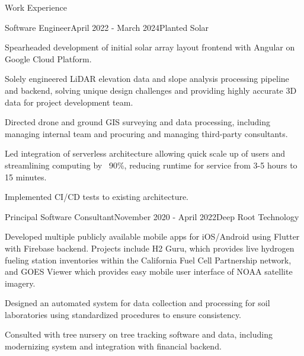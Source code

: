 \documentclass{resume} %
\begin{document}

\begin{rSection}{Work Experience}


\begin{rSubsection}{Software Engineer}{April 2022 - March 2024}{Planted Solar}{}
\item Spearheaded development of initial solar array layout frontend with Angular on Google Cloud Platform.
\item Solely engineered LiDAR elevation data and slope analysis processing pipeline and backend, solving unique design challenges and providing highly accurate 3D data for project development team.
\item Directed drone and ground GIS surveying and data processing, including managing internal team and procuring and managing third-party consultants.
\item Led integration of serverless architecture allowing quick scale up of users and streamlining computing by ~90\%, reducing runtime for service from 3-5 hours to 15 minutes.
\item Implemented CI/CD tests to existing architecture.
\end{rSubsection}



\begin{rSubsection}{Principal Software Consultant}{November 2020 - April 2022}{Deep Root Technology}{}
    \item Developed multiple publicly available mobile apps for iOS/Android using Flutter with Firebase backend. Projects include H2 Guru, which provides live hydrogen fueling station inventories within the California Fuel Cell Partnership network, and GOES Viewer which provides easy mobile user interface of NOAA satellite imagery. 
    \item Designed an automated system for data collection and processing for soil laboratories using standardized procedures to ensure consistency.
    \item Consulted with tree nursery on tree tracking software and data, including modernizing system and integration with financial backend.


\end{rSubsection}
\end{rSection}
\end{document}
